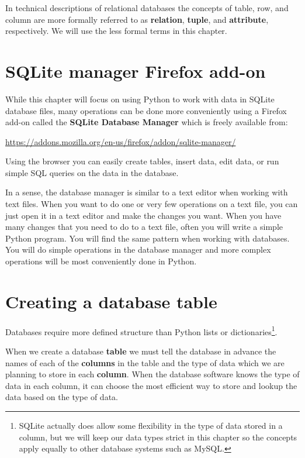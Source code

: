\documentclass[11pt]{book}
\begin{document}
In technical descriptions of relational databases the concepts of 
table, row, and column are more formally referred
to as {\bf relation}, {\bf tuple}, and {\bf attribute}, respectively.
We will use the less formal terms in this chapter.

\section{SQLite manager Firefox add-on}

While this chapter will focus on using Python to work with data 
in SQLite database files, many operations can be done more
conveniently using a Firefox add-on called the {\bf SQLite
Database Manager} which is freely available from:

\url{https://addons.mozilla.org/en-us/firefox/addon/sqlite-manager/}

Using the browser you can easily create tables, insert data, edit data, 
or run simple SQL queries on the data in the database.

In a sense, the database manager is similar to a text editor
when working with text files.   When you want to do one or
very few operations on a text file, you can just open it
in a text editor and make the changes you want.   When you have 
many changes that you need to do to a text file, often you 
will write a simple Python program.  You will find the same 
pattern when working with databases.  You will do simple
operations in the database manager and more complex operations
will be most conveniently done in Python.

\section{Creating a database table}

Databases require more defined structure than Python lists 
or dictionaries\footnote{SQLite actually does allow some 
flexibility in the type of data stored in a column,
but we will keep our data types strict in this chapter
so the concepts apply equally to other database systems 
such as MySQL.}.  

When we create a database {\bf table} we
must tell the database in advance the names of each of the
{\bf columns} in the table and the type of data which we are 
planning to store in each {\bf column}.   When the database software
knows the type of data in each column, it can choose the most 
efficient way to store and lookup the data based on the type of
data. 
\end{document}
